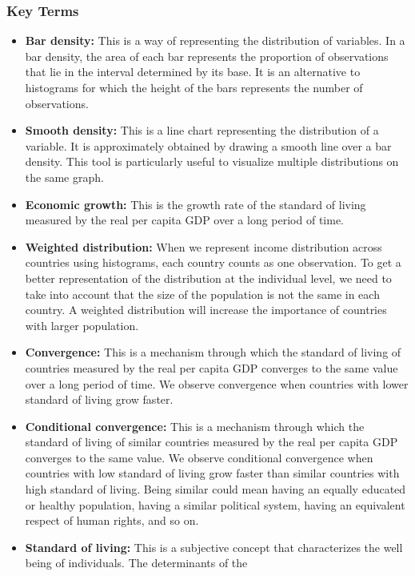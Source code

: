 \documentclass[letterpaper]{article}\usepackage[]{graphicx}\usepackage[]{color}
\numberwithin{exer}{section}
\theoremstyle{nonumberplain}
\begin{document}
\subsubsection*{Key Terms}
  
\begin{itemize}
\item \textbf{Bar density:} This is a way of representing the
  distribution of variables. In a bar density, the area of each bar
  represents the proportion of observations that lie in the interval
  determined by its base. It is an alternative to histograms for which
  the height of the bars represents the number of observations.
\item \textbf{Smooth density:} This is a line chart representing the
  distribution of a variable. It is approximately obtained by drawing
  a smooth line over a bar density. This tool is particularly useful
  to visualize multiple distributions on the same graph.
\item \textbf{Economic growth:} This is the growth rate of the
  standard of living measured by the real per capita GDP over a long
  period of time. 
\item \textbf{Weighted distribution:} When we represent income
  distribution across countries using histograms, each country counts
  as one observation. To get a better representation of the
  distribution at the individual level, we need to take into account
  that the size of the population is not the same in each country. A
  weighted distribution will increase the importance of countries with
  larger population.
\item \textbf{Convergence:} This is a mechanism through which the
  standard of living of countries measured by the real per capita GDP
  converges to the same value over a long period of time. We observe
  convergence when countries with lower standard of living grow
  faster.
\item \textbf{Conditional convergence:} This is a mechanism through
  which the standard of living of similar countries measured by the
  real per capita GDP converges to the same value. We observe
  conditional convergence when countries with low standard of living
  grow faster than similar countries with high standard of
  living. Being similar could mean having an equally educated or
  healthy population, having a similar political system, having an
  equivalent respect of human rights, and so on.
\item \textbf{Standard of living:} This is a subjective concept that
  characterizes the well being of individuals. The determinants of the

\end{itemize}
\end{document}
